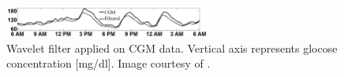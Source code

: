 \begin{figure}[ht!]
  \centering
  \includegraphics[width=0.6\textwidth]{images/wavelet_example.jpg}
  \caption[]
  {\small Wavelet filter applied on CGM data. Vertical axis represents glocose concentration [mg/dl]. Image courtesy of \textcite{samadi2017}.}
  \label{fig:wavelet_example}
\end{figure}
